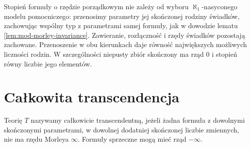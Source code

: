 Stopień formuły o rzędzie porządkowym nie zależy
od wyboru $\aleph_1$-nasyconego modelu pomocniczego:
przenosimy parametry jej skończonej rodziny świadków,
zachowując wspólny typ z parametrami samej formuły,
jak w dowodzie lematu \ref{lem:mod-morley-invariance}.
Zawieranie, rozłączność i rzędy świadków pozostają
zachowane. Przenoszenie w obu kierunkach daje
równość największych możliwych liczności rodzin.
W szczególności niepusty zbiór skończony ma
rząd $0$ i stopień równy liczbie jego elementów.

\section{Całkowita transcendencja}

\begin{definicja}
\label{def:mod-total-transcendence}
Teorię $T$ nazywamy całkowicie transcendentną,
jeżeli żadna formuła z dowolnymi skończonymi
parametrami, w dowolnej dodatniej skończonej
liczbie zmiennych, nie ma rzędu Morleya $\infty$.
Formuły sprzeczne mogą mieć rząd $-\infty$.
\end{definicja}

